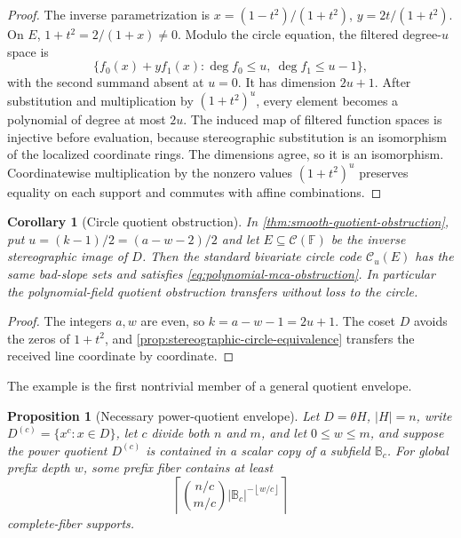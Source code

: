 \documentclass[12pt,a4paper]{amsart}
\numberwithin{equation}{section}
\newtheorem{proposition}[proposition]{Proposition}
\newtheorem{corollary}[corollary]{Corollary}
\theoremstyle{remark}
\newcommand{\F}{\mathbb F}
\newcommand{\B}{\mathbb B}
\newcommand{\abs}[1]{\lvert #1\rvert}
\newcommand{\floor}[1]{\left\lfloor #1\right\rfloor}
\begin{document}
\begin{proof}
The inverse parametrization is
\(x=(1-t^2)/(1+t^2)\), \(y=2t/(1+t^2)\).  On \(E\),
\(1+t^2=2/(1+x)\ne0\).  Modulo the circle equation, the
filtered degree-\(u\) space is
\[
 \{f_0(x)+yf_1(x):\deg f_0\le u,\ \deg f_1\le u-1\},
\]
with the second summand absent at \(u=0\).  It has dimension \(2u+1\).
After substitution and multiplication by \((1+t^2)^u\), every element
becomes a polynomial of degree at most \(2u\).  The induced map of filtered
function spaces is injective before evaluation, because stereographic
substitution is an isomorphism of the localized coordinate rings.  The
dimensions agree, so it is an isomorphism.  Coordinatewise multiplication
by the nonzero values \((1+t^2)^u\) preserves equality on each support and
commutes with affine combinations.
\end{proof}

\begin{corollary}[Circle quotient obstruction]
\label{cor:circle-quotient-obstruction}
In \cref{thm:smooth-quotient-obstruction}, put
\(u=(k-1)/2=(a-w-2)/2\) and let \(E\subseteq\mathcal C(\F)\) be the inverse
stereographic image of \(D\).  Then the standard bivariate circle code
\(\mathcal C_u(E)\) has the same bad-slope sets and satisfies
\eqref{eq:polynomial-mca-obstruction}.  In particular the polynomial-field
quotient obstruction transfers without loss to the circle.
\end{corollary}

\begin{proof}
The integers \(a,w\) are even, so \(k=a-w-1=2u+1\).  The coset \(D\) avoids the
zeros of \(1+t^2\), and
\cref{prop:stereographic-circle-equivalence} transfers the received line
coordinate by coordinate.
\end{proof}

The example is the first nontrivial member of a general quotient envelope.

\begin{proposition}[Necessary power-quotient envelope]
\label{prop:necessary-quotient-envelope}
Let \(D=\theta H\), \(\abs H=n\), write
\(D^{(c)}=\{x^c:x\in D\}\), let \(c\) divide both \(n\) and \(m\), and let
\(0\le w\le m\), and suppose the
power quotient \(D^{(c)}\) is contained in a scalar copy of a subfield
\(\B_c\).  For global prefix depth \(w\), some prefix fiber contains at
least
\[
 \left\lceil
 \binom{n/c}{m/c}\abs{\B_c}^{-\floor{w/c}}
 \right\rceil
 \tag{6.13}\label{eq:necessary-quotient-envelope}
\]
complete-fiber supports.
\end{proposition}
\end{document}
